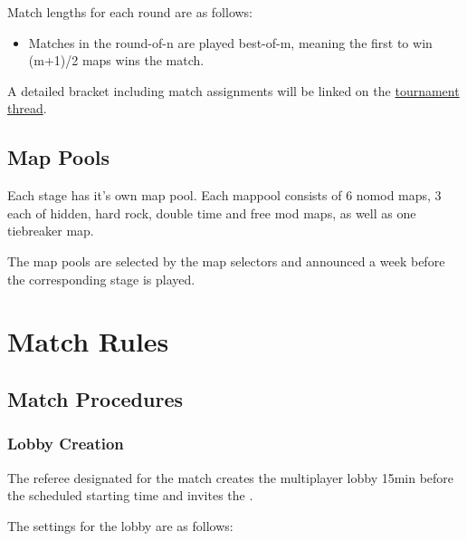 \begin{samepage}
Match lengths for each round are as follows:
\begin{itemize}
	\item Matches in the round-of-n are played best-of-m, meaning the first  to win (m+1)/2 maps wins the match.


\end{itemize}
\end{samepage}

A detailed bracket including match assignments will be linked on the \href{\thread}{tournament thread}.

\subsection{Map Pools}

Each stage has it's own map pool. Each mappool consists of 6 nomod maps, 3 each of hidden, hard rock, double time and free mod maps, as well as one tiebreaker map.

The map pools are selected by the map selectors and announced a week before the corresponding stage is played.


\section{Match Rules}

\subsection{Match Procedures}

\subsubsection{Lobby Creation}
The referee designated for the match creates the multiplayer lobby 15min before the scheduled starting time and invites the .

\begin{samepage}
The settings for the lobby are as follows:


\end{samepage}

